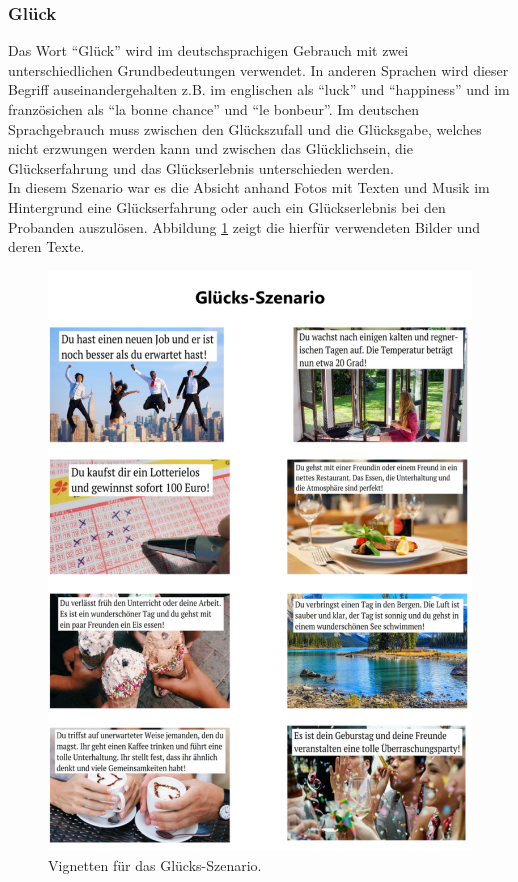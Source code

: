 \subsubsection{Gl{\"u}ck} \label{glueck-1}






Das Wort ``Gl{\"u}ck'' wird im deutschsprachigen Gebrauch mit zwei unterschiedlichen Grundbedeutungen verwendet. 
In anderen Sprachen wird dieser Begriff auseinandergehalten z.B. im englischen als ``luck'' und ``happiness'' und im franz{\"o}sichen als ``la bonne chance'' und ``le bonbeur''.
Im deutschen Sprachgebrauch muss zwischen den Gl{\"u}ckszufall und die Gl{\"u}cksgabe, welches nicht erzwungen werden kann und zwischen das Gl{\"u}cklichsein, die Gl{\"u}ckserfahrung und das Gl{\"u}ckserlebnis unterschieden werden\cite{bien19}. \\

In diesem Szenario war es die Absicht anhand Fotos mit Texten und Musik im Hintergrund eine Gl{\"u}ckserfahrung oder auch ein Gl{\"u}ckserlebnis bei den Probanden auszul{\"o}sen.
Abbildung \ref{fig-glueck} zeigt die hierf{\"u}r verwendeten Bilder und deren Texte. \\

\begin{figure}[H] \centering
\includegraphics[width=12cm]{Images/gluck.png} 
\vspace{-0.3cm} 
\caption{Vignetten f{\"u}r das Gl{\"u}cks-Szenario.}
\label{fig-glueck} 
\end{figure}

